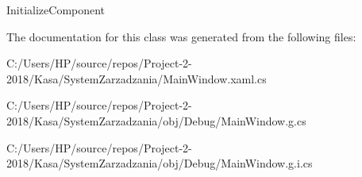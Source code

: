 Initialize\+Component 



The documentation for this class was generated from the following files\+:\begin{DoxyCompactItemize}
\item 
C\+:/\+Users/\+H\+P/source/repos/\+Project-\/2-\/2018/\+Kasa/\+System\+Zarzadzania/Main\+Window.\+xaml.\+cs\item 
C\+:/\+Users/\+H\+P/source/repos/\+Project-\/2-\/2018/\+Kasa/\+System\+Zarzadzania/obj/\+Debug/Main\+Window.\+g.\+cs\item 
C\+:/\+Users/\+H\+P/source/repos/\+Project-\/2-\/2018/\+Kasa/\+System\+Zarzadzania/obj/\+Debug/Main\+Window.\+g.\+i.\+cs\end{DoxyCompactItemize}

